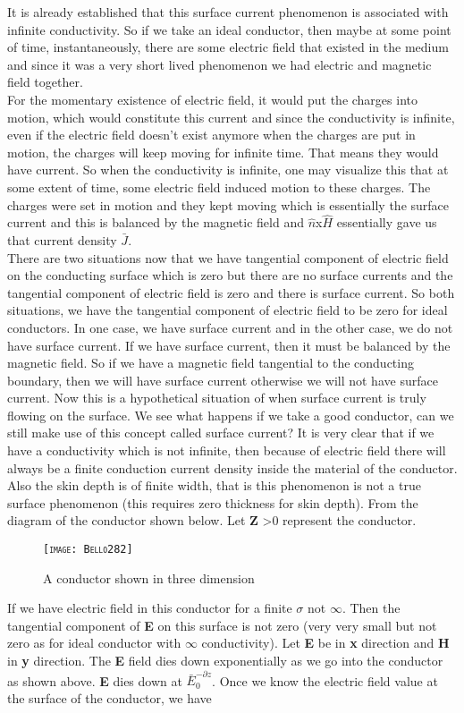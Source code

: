It is already established that this surface current phenomenon is associated with infinite conductivity. So if we take an ideal conductor, then maybe at some point of time, instantaneously, there are some electric field that existed in the medium and since it was a very short lived phenomenon we had electric and magnetic field together.\\
 For the momentary existence of electric field, it would put the charges into motion, which would constitute this current and since the conductivity is infinite, even if the electric field doesn't exist anymore when the charges are put in motion, the charges will keep moving for infinite time. That means they would have current. So when the conductivity is infinite, one may visualize this that at some extent of time, some electric field induced motion to these charges. The charges were set in motion and they kept moving which is essentially the surface current and this is balanced by the magnetic field and $\hat{n}$x$\hat{H}$ essentially gave us that current density $\bar{J}$.\\
 
  There are two situations now that we have tangential component of electric field on the conducting surface which is zero but there are no surface currents and the tangential component of electric field is zero and there is surface current. So both situations, we have the tangential component of electric field to be zero for ideal conductors. In one case, we have surface current and in the other case, we do not have surface current. If we have surface current, then it must be balanced by the magnetic field. So if we have a magnetic field tangential to the conducting boundary, then we will have surface current otherwise we will not have surface current. Now this is a hypothetical situation of when surface current is truly flowing on the surface. We see what happens if we take a good conductor, can we still make use of this concept called surface current? It is very clear that if we have a conductivity which is not infinite, then because of electric field there will always be a finite conduction current density inside the material of the conductor. Also the skin depth is of finite width, that is this phenomenon is not a true surface phenomenon (this requires zero thickness for skin depth). From the diagram of the conductor shown below. Let \textbf{Z} \textgreater 0 represent the conductor.\\
\begin{figure}
\centering
\textsc{\texttt{[image: Bello282]}}
\caption{A conductor shown in three dimension}
\end{figure}	
If we have electric field in this conductor for a finite $\sigma$ not $\infty$. Then the tangential component of \textbf{E} on this surface is not zero (very very small but not zero as for ideal conductor with $\infty$ conductivity). Let \textbf{E} be in \textbf{x} direction and \textbf{H} in \textbf{y} direction. The \textbf{E} field dies down exponentially as we go into the conductor as shown above. \textbf{E} dies down at $\bar{E}_0^{-\partial z}$. Once we know the electric field value at the surface of the conductor, we have

